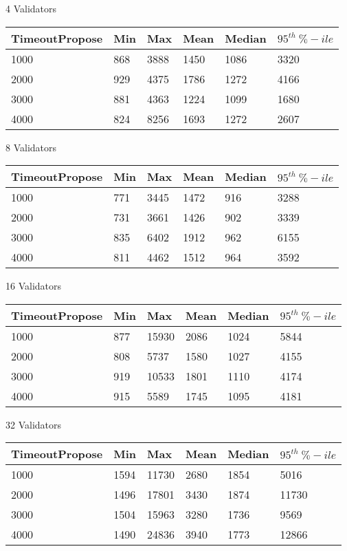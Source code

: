 4 Validators

\begin{center}
	\begin{tabular}{| l | l | l | l | l | l | }
		\hline
		TimeoutPropose & Min & Max & Mean & Median & $95^{th} \ \%-ile$ \\ \hline
		1000 & 868 & 3888 & 1450 & 1086 & 3320 \\ \hline
		2000 & 929 & 4375 & 1786 & 1272 & 4166 \\ \hline
		3000 & 881 & 4363 & 1224 & 1099 & 1680 \\ \hline
		4000 & 824 & 8256 & 1693 & 1272 & 2607 \\ \hline
	\end{tabular}
\end{center}

8 Validators

\begin{center}
	\begin{tabular}{| l | l | l | l | l | l | }
		\hline
		TimeoutPropose & Min & Max & Mean & Median & $95^{th} \ \%-ile$ \\ \hline
		1000 & 771 & 3445 & 1472 & 916 & 3288 \\ \hline
		2000 & 731 & 3661 & 1426 & 902 & 3339 \\ \hline
		3000 & 835 & 6402 & 1912 & 962 & 6155 \\ \hline
		4000 & 811 & 4462 & 1512 & 964 & 3592 \\ \hline
	\end{tabular}
\end{center}

16 Validators

\begin{center}
	\begin{tabular}{| l | l | l | l | l | l | }
		\hline
		TimeoutPropose & Min & Max & Mean & Median & $95^{th} \ \%-ile$ \\ \hline
		1000 & 877 & 15930 & 2086 & 1024 & 5844 \\ \hline
		2000 & 808 & 5737 & 1580 & 1027 & 4155 \\ \hline
		3000 & 919 & 10533 & 1801 & 1110 & 4174 \\ \hline
		4000 & 915 & 5589 & 1745 & 1095 & 4181 \\ \hline
	\end{tabular}
\end{center}

32 Validators

\begin{center}
	\begin{tabular}{| l | l | l | l | l | l | }
		\hline
		TimeoutPropose & Min & Max & Mean & Median & $95^{th} \ \%-ile$ \\ \hline
		1000 & 1594 & 11730 & 2680 & 1854 & 5016 \\ \hline
		2000 & 1496 & 17801 & 3430 & 1874 & 11730 \\ \hline
		3000 & 1504 & 15963 & 3280 & 1736 & 9569 \\ \hline
		4000 & 1490 & 24836 & 3940 & 1773 & 12866 \\ \hline
	\end{tabular}
\end{center}

